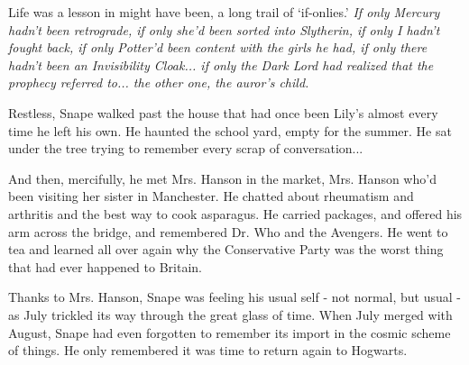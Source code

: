\documentclass[a4paper,11pt]{article}
\begin{document}
Life was a lesson in might have been, a long trail of `if-onlies.' \emph{If only Mercury hadn't been retrograde, if only she'd been sorted into Slytherin, if only I hadn't fought back, if only Potter'd been content with the girls he had, if only there hadn't been an Invisibility Cloak... if only the Dark Lord had realized that the prophecy referred to... the other one, the auror's child.}

Restless, Snape walked past the house that had once been Lily's almost every time he left his own. He haunted the school yard, empty for the summer. He sat under the tree trying to remember every scrap of conversation...

And then, mercifully, he met Mrs. Hanson in the market, Mrs. Hanson who'd been visiting her sister in Manchester. He chatted about rheumatism and arthritis and the best way to cook asparagus. He carried packages, and offered his arm across the bridge, and remembered Dr. Who and the Avengers. He went to tea and learned all over again why the Conservative Party was the worst thing that had ever happened to Britain.

Thanks to Mrs. Hanson, Snape was feeling his usual self - not normal, but usual - as July trickled its way through the great glass of time. When July merged with August, Snape had even forgotten to remember its import in the cosmic scheme of things. He only remembered it was time to return again to Hogwarts.
\end{document}
